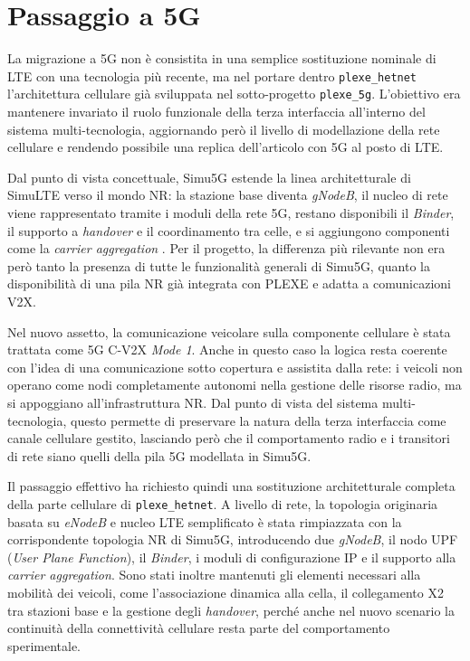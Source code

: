 \section{Passaggio a 5G}

La migrazione a 5G non è consistita in una semplice sostituzione nominale di LTE con una tecnologia più recente, ma nel portare dentro \texttt{plexe\_hetnet} l'architettura cellulare già sviluppata nel sotto-progetto \texttt{plexe\_5g}. L'obiettivo era mantenere invariato il ruolo funzionale della terza interfaccia all'interno del sistema multi-tecnologia, aggiornando però il livello di modellazione della rete cellulare e rendendo possibile una replica dell'articolo con 5G al posto di LTE.

Dal punto di vista concettuale, Simu5G estende la linea architetturale di SimuLTE verso il mondo NR: la stazione base diventa \emph{gNodeB}, il nucleo di rete viene rappresentato tramite i moduli della rete 5G, restano disponibili il \emph{Binder}, il supporto a \emph{handover} e il coordinamento tra celle, e si aggiungono componenti come la \emph{carrier aggregation} \cite{nardini2020simu5g}. Per il progetto, la differenza più rilevante non era però tanto la presenza di tutte le funzionalità generali di Simu5G, quanto la disponibilità di una pila NR già integrata con PLEXE e adatta a comunicazioni V2X.

Nel nuovo assetto, la comunicazione veicolare sulla componente cellulare è stata trattata come 5G C-V2X \emph{Mode 1}. Anche in questo caso la logica resta coerente con l'idea di una comunicazione sotto copertura e assistita dalla rete: i veicoli non operano come nodi completamente autonomi nella gestione delle risorse radio, ma si appoggiano all'infrastruttura NR. Dal punto di vista del sistema multi-tecnologia, questo permette di preservare la natura della terza interfaccia come canale cellulare gestito, lasciando però che il comportamento radio e i transitori di rete siano quelli della pila 5G modellata in Simu5G.

Il passaggio effettivo ha richiesto quindi una sostituzione architetturale completa della parte cellulare di \texttt{plexe\_hetnet}. A livello di rete, la topologia originaria basata su \emph{eNodeB} e nucleo LTE semplificato è stata rimpiazzata con la corrispondente topologia NR di Simu5G, introducendo due \emph{gNodeB}, il nodo UPF (\emph{User Plane Function}), il \emph{Binder}, i moduli di configurazione IP e il supporto alla \emph{carrier aggregation}. Sono stati inoltre mantenuti gli elementi necessari alla mobilità dei veicoli, come l'associazione dinamica alla cella, il collegamento X2 tra stazioni base e la gestione degli \emph{handover}, perché anche nel nuovo scenario la continuità della connettività cellulare resta parte del comportamento sperimentale.

